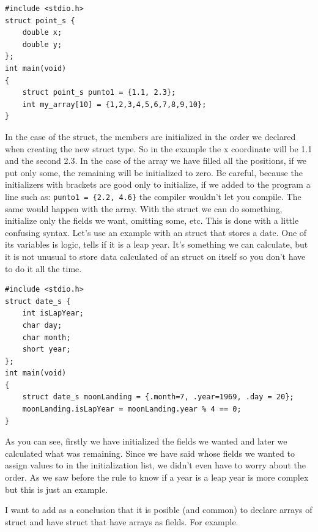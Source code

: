 \documentclass[a4paper]{article}
\begin{document}
\noindent
\begin{minipage}[H]{\linewidth}
\mbox{}
\begin{lstlisting}[style=C,
caption={Initializing with brackets},
label={lst:initializationLists}]
#include <stdio.h>
struct point_s {
    double x;
    double y;
};
int main(void)
{
    struct point_s punto1 = {1.1, 2.3};
    int my_array[10] = {1,2,3,4,5,6,7,8,9,10};
}
\end{lstlisting}
\end{minipage}

In the case of the struct, the members are initialized in the order we declared
when creating the new struct type. So in the example the x coordinate will be
1.1 and the second 2.3. In the case of the array we have filled all the
positions, if we put only some, the remaining will be initialized to zero.
Be careful, because the initializers with brackets are good only to initialize,
if we added to the program a line such as:
\lstinline[style=C]!punto1 = {2.2, 4.6}! the
compiler wouldn't let you compile. The same would happen with the array. With
the struct we can do something, initialize only the fields we want, omitting
some, etc. This is done with a little confusing syntax. Let's use an example
with an struct that stores a date. One of its variables is logic, tells if it
is a leap year. It's something we can calculate, but it is not unusual to
store data calculated of an struct on itself so you don't have to do it
all the time.

\noindent
\begin{minipage}[H]{\linewidth}
\mbox{}
\begin{lstlisting}[style=C,
caption={Initializing a struct with brackets and field selection},
label={lst:dateStruct}]
#include <stdio.h>
struct date_s {
    int isLapYear;
    char day;
    char month;
    short year;
};
int main(void)
{
    struct date_s moonLanding = {.month=7, .year=1969, .day = 20};
    moonLanding.isLapYear = moonLanding.year % 4 == 0;
}
\end{lstlisting}
\end{minipage}

As you can see, firstly we have initialized the fields we wanted and later we
calculated what was remaining. Since we have said whose fields we wanted to
assign values to in the initialization list, we didn't even have to worry about
the order. As we saw before the rule to know if a year is a leap year is more
complex but this is just an example.

I want to add as a conclusion that it is posible (and common) to declare arrays
of struct and have struct that have arrays as fields. For example.
\end{document}
